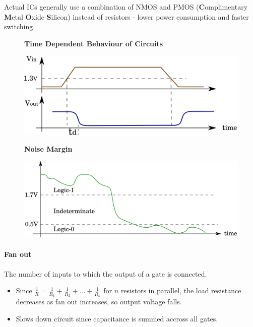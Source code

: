 \documentclass[twocolumn,english]{article}
\begin{document}
Actual ICs generally use a combination of NMOS and PMOS (\textbf{C}omplimentary
\textbf{M}etal \textbf{O}xide \textbf{S}ilicon) instead of resistors
- lower power consumption and faster switching.

\begin{figure}[H]
\textbf{Time Dependent Behaviour of Circuits}

\noindent \centering{}\includegraphics[width=0.25\paperwidth]{img/td}
\end{figure}


\begin{figure}[H]
\noindent \textbf{Noise Margin}

\noindent \centering{}\includegraphics[width=0.3\paperwidth]{img/noise}
\end{figure}



\paragraph{Fan out}

The number of inputs to which the output of a gate is connected.
\begin{itemize}
\item Since $\frac{1}{R}=\frac{1}{R_{1}}+\frac{1}{R_{2}}+\dots+\frac{1}{R_{n}}$
for $n$ resistors in parallel, the load resistance decreases as fan
out increases, so output voltage falls.
\item Slows down circuit since capacitance is summed accross all gates.
\end{itemize}
\end{document}
